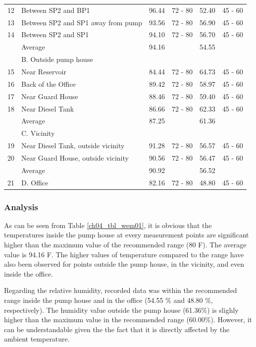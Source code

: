 \begin{table}[!htb]
{\begin{tabular}{c|l|c|c|c|c}
	12 & Between SP2 and BP1 & 96.44 & 72 - 80 & 52.40 & 45 - 60 \\ 
	13 & Between SP2 and SP1 away from pump & 93.56 & 72 - 80 & 56.90 & 45 - 60 \\ 
	14 & Between SP2 and SP1 & 94.10 & 72 - 80 & 56.70 & 45 - 60 \\ 
	& Average & 94.16 &  & 54.55 &  \\ 
	\hline
	& B. Outside pump house &  &  &  &  \\ 
	15 & Near Reservoir & 84.44 & 72 - 80 & 64.73 & 45 - 60 \\ 
	16 & Back of the Office & 89.42 & 72 - 80 & 58.97 & 45 - 60 \\ 
	17 & Near Guard House & 88.46 & 72 - 80 & 59.40 & 45 - 60 \\ 
	18 & Near Diesel Tank & 86.66 & 72 - 80 & 62.33 & 45 - 60 \\ 
	& Average & 87.25 &  & 61.36 &  \\ 
	\hline
	& C. Vicinity &  &  &  &  \\ 
	19 & Near Diesel Tank, outside vicinity & 91.28 & 72 - 80 & 56.57 & 45 - 60 \\ 
	20 & Near Guard House, outside vicinity & 90.56 & 72 - 80 & 56.47 & 45 - 60 \\ 
	& Average & 90.92 &  & 56.52 &  \\ 
	\hline
	21 & D. Office & 82.16 & 72 - 80 & 48.80 & 45 - 60 \\ 
	\hline
\end{tabular}

	}
\end{table}

\subsubsection{Analysis}
As can be seen from Table \ref{ch04_tbl_wem01}, it is obvious that the temperatures inside the pump house at every measurement points are significant higher than the maximum value of the recommended range (80 F). The average value is 94.16 F. The higher values of temperature compared to the range have also been observed for points outside the pump house, in the vicinity, and even inside the office. 

Regarding the relative humidity, recorded data was within the recommended range inside the pump house and in the office (54.55 \% and 48.80 \%, respectively). The humidity value outside the pump house (61.36\%) is slighly higher than the maximum value in the recommended range (60.00\%). However, it can be understandable given the the fact that it is directly affected by the ambient temperature.

